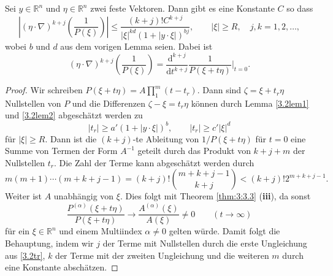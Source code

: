 \begin{lem}\label{3.2lem3}
Sei $y\in \mathbb R^n$ und $\eta \in \mathbb R^n$ zwei feste Vektoren. Dann gibt es eine Konstante $C$ so dass
\begin{equation}
\left |(\eta\cdot\nabla)^{k+j} \left ( \frac{1}{P(\xi)} \right )  \right | \le \frac{(k+j)! C^{k+j}}{|\xi|^{kd} ( 1+ | y\cdot\xi | )^{bj}},\qquad  |\xi|\ge R, \quad j, k=1,2,\ldots,
\end{equation}
wobei $b$ und $d$ aus dem vorigen Lemma seien. Dabei ist
\begin{equation}
(\eta\cdot\nabla)^{k+j} \left (\frac{1}{P(\xi)} \right ) =  \frac{\mathrm d^{k+j}}{\mathrm d t^{k+j}}  \frac{1}{P(\xi+ t\eta)} \bigg|_{t=0}.
\end{equation}
\end{lem}
\begin{proof}
Wir schreiben $P(\xi+t\eta) = A \prod_{1}^m (t-t_r) $. Dann sind $\zeta = \xi+ t_r \eta$ Nullstellen von $P$ und die Differenzen $\zeta - \xi = t_r \eta$ können 
durch Lemma \ref{3.2lem1} und \ref{3.2lem2} abgeschätzt werden zu
\begin{equation}\label{3.2tr}
|t_r| \ge a' (1+| y\cdot  \xi |)^b,\qquad |t_r|\ge c' |\xi|^d
\end{equation}
für $|\xi|\ge R$. Dann ist die $(k+j)$-te  Ableitung von $1/P(\xi+t\eta)$ für $t=0$ eine Summe von Termen der Form $A^{-1}$ geteilt durch das Produkt von $k+j+m$ der Nullstellen $t_r$. Die Zahl der Terme kann abgeschätzt werden durch
\begin{equation}
m(m+1) \cdots (m+k+j-1) =(k+j)! \binom{m+k+j-1}{k+j}<(k+j)! 2^{m+k+j-1}.
\end{equation}
Weiter ist $A$ unabhängig von $\xi$. Dies folgt mit Theorem \ref{thm:3:3.3} ({\bf iii}), da sonst
\begin{equation}
\frac{P^{(\alpha)}(\xi + t\eta)}{P(\xi + t\eta)}\to \frac{A^{(\alpha)}(\xi)}{A(\xi)}\neq 0\qquad(t\to \infty)
\end{equation}
für ein $\xi\in \mathbb R^n$ und einem Multiindex $\alpha\neq 0$ gelten würde.
Damit folgt die Behauptung, indem wir $j$ der Terme mit Nullstellen durch die erste Ungleichung aus \eqref{3.2tr}, $k$ der Terme mit der zweiten Ungleichung und die weiteren $m$ durch eine Konstante abschätzen.  
\end{proof}


